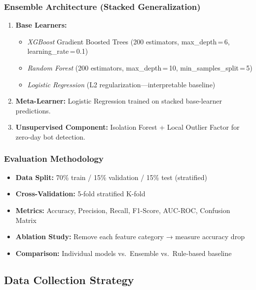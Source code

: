 \documentclass[12pt, a4paper]{article}
\begin{document}
\subsubsection{Ensemble Architecture (Stacked Generalization)}
\begin{enumerate}[leftmargin=*]
    \item \textbf{Base Learners:}
    \begin{itemize}
        \item \textit{XGBoost} Gradient Boosted Trees (200 estimators, max\_depth\,=\,6, learning\_rate\,=\,0.1)
        \item \textit{Random Forest} (200 estimators, max\_depth\,=\,10, min\_samples\_split\,=\,5)
        \item \textit{Logistic Regression} (L2 regularization---interpretable baseline)
    \end{itemize}
    \item \textbf{Meta-Learner:} Logistic Regression trained on stacked base-learner predictions.
    \item \textbf{Unsupervised Component:} Isolation Forest + Local Outlier Factor for zero-day bot detection.
\end{enumerate}

\subsubsection{Evaluation Methodology}
\begin{itemize}[leftmargin=*]
    \item \textbf{Data Split:} 70\% train / 15\% validation / 15\% test (stratified)
    \item \textbf{Cross-Validation:} 5-fold stratified K-fold
    \item \textbf{Metrics:} Accuracy, Precision, Recall, F1-Score, AUC-ROC, Confusion Matrix
    \item \textbf{Ablation Study:} Remove each feature category → measure accuracy drop
    \item \textbf{Comparison:} Individual models vs.\ Ensemble vs.\ Rule-based baseline
\end{itemize}

\subsection{Data Collection Strategy}
\end{document}
